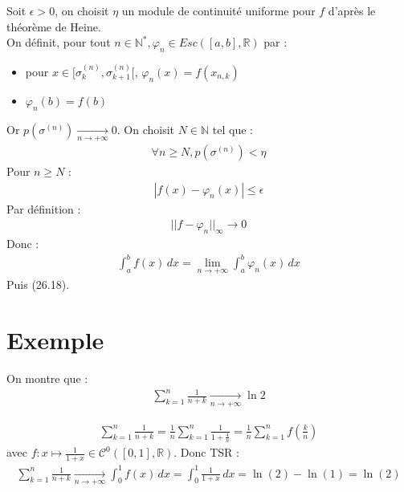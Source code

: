 \documentclass[../main.tex]{subfiles}
\begin{document}
\noindent Soit $\epsilon > 0$, on choisit $\eta$ un module de continuité uniforme pour $f$ d'après le théorème de Heine. \\
On définit, pour tout $n\in \mathbb{N}^*, \varphi_n \in Esc([a, b], \mathbb{R})$ par : 
\begin{itemize}
    \item pour $x\in [\sigma_k^{(n)}, \sigma_{k+1}^{(n)}[$, $\varphi_n(x) = f(x_{n,k})$
    \item $\varphi_n(b) = f(b)$
\end{itemize}
Or $p(\sigma^{(n)}) \underset{n \to +\infty}{\longrightarrow} 0$. On choisit $N\in \mathbb{N}$ tel que : 
\begin{align*}
    \forall n\geq N, p(\sigma^{(n)}) < \eta
\end{align*}
Pour $n\geq N$ : 
\begin{align*}
    |f(x) - \varphi_n(x)| \leq \epsilon
\end{align*}
Par définition : 
\begin{align*}
    ||f - \varphi_n||_{\infty} \longrightarrow 0
\end{align*}
Donc : 
\begin{align*}
    \int_{a}^{b} f(x) \,dx = \lim_{n\to +\infty} \int_{a}^{b} \varphi_n(x) \,dx
\end{align*}
Puis (26.18). 

\section{Exemple}
\begin{tcolorbox}[title=Exemple 26.72, title filled=false, colframe=darkgreen, colback=darkgreen!10!white]
    On montre que : 
    \begin{align*}
        \sum_{k=1}^{n} \frac{1}{n+k} \underset{n \to +\infty}{\longrightarrow} \ln 2
    \end{align*}
\end{tcolorbox}

\begin{align*}
    \sum_{k=1}^{n} \frac{1}{n+k} = \frac{1}{n} \sum_{k=1}^{n} \frac{1}{1 + \frac{4}{n}} = \frac{1}{n} \sum_{k=1}^{n} f(\frac{k}{n})
\end{align*}
avec $f:x\mapsto \frac{1}{1 + x}\in \mathcal{C}^0([0, 1], \mathbb{R})$.
Donc TSR : 
\begin{align*}
    \sum_{k=1}^{n} \frac{1}{n+k} \underset{n \to +\infty}{\longrightarrow} \int_{0}^{1} f(x) \,dx = \int_{0}^{1} \frac{1}{1+x} \,dx = \ln(2) - \ln(1) = \ln(2)
\end{align*}
\end{document}
